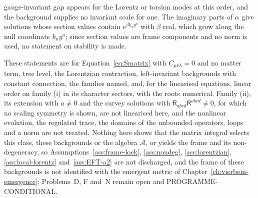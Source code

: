 gauge-invariant gap appears for the Lorentz or torsion modes at this order, and the background supplies no invariant scale for one. The imaginary parts of \(\alpha\) give solutions whose section values contain \(\mathrm e^{\beta k_ay^a}\) with \(\beta\) real, which grow along the null coordinate \(k_ay^a\); since section values are frame components and no norm is used, no statement on stability is made.

These statements are for Equation~\eqref{eq:Smatrix} with \(C_{\mu\nu\lambda}=0\) and no matter term, tree level, the Lorentzian contraction, left-invariant backgrounds with constant connection, the families named, and, for the linearised equations, linear order on family (i) in its character sectors, with the roots numerical. Family (ii), its extension with \(a\neq0\) and the survey solutions with \(\mathsf R_{abcd}\mathsf R^{abcd}\neq0\), for which no scaling symmetry is shown, are not linearised here, and the nonlinear evolution, the regulated trace, the domains of the unbounded operators, loops and a norm are not treated. Nothing here shows that the matrix integral selects this class, these backgrounds or the algebra \(\mathcal A\), or yields the frame and its non-degeneracy, so Assumptions~\ref{ass:frame-lock}, \ref{ass:nondeg}, \ref{ass:lorentzian}, \ref{ass:local-lorentz} and~\ref{ass:EFT-a2} are not discharged, and the frame of these backgrounds is not identified with the emergent metric of Chapter~\ref{ch:vierbein-emergence}; Problems~D, F and~N remain open and PROGRAMME-CONDITIONAL.
